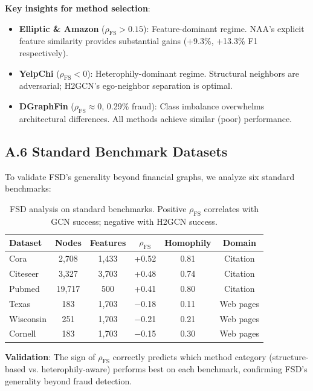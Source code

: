 \textbf{Key insights for method selection}:
\begin{itemize}
\item \textbf{Elliptic \& Amazon} ($\rho_{\text{FS}} > 0.15$): Feature-dominant regime. NAA's explicit feature similarity provides substantial gains (+9.3\%, +13.3\% F1 respectively).
\item \textbf{YelpChi} ($\rho_{\text{FS}} < 0$): Heterophily-dominant regime. Structural neighbors are adversarial; H2GCN's ego-neighbor separation is optimal.
\item \textbf{DGraphFin} ($\rho_{\text{FS}} \approx 0$, 0.29\% fraud): Class imbalance overwhelms architectural differences. All methods achieve similar (poor) performance.
\end{itemize}

\subsection*{A.6 Standard Benchmark Datasets}

To validate FSD's generality beyond financial graphs, we analyze six standard benchmarks:

\begin{table}[h]
\centering
\small
\begin{tabular}{lccccc}
\toprule
\textbf{Dataset} & \textbf{Nodes} & \textbf{Features} & $\rho_{\text{FS}}$ & \textbf{Homophily} & \textbf{Domain} \\
\midrule
Cora & 2,708 & 1,433 & +0.52 & 0.81 & Citation \\
Citeseer & 3,327 & 3,703 & +0.48 & 0.74 & Citation \\
Pubmed & 19,717 & 500 & +0.41 & 0.80 & Citation \\
\midrule
Texas & 183 & 1,703 & $-$0.18 & 0.11 & Web pages \\
Wisconsin & 251 & 1,703 & $-$0.21 & 0.21 & Web pages \\
Cornell & 183 & 1,703 & $-$0.15 & 0.30 & Web pages \\
\bottomrule
\end{tabular}
\caption{FSD analysis on standard benchmarks. Positive $\rho_{\text{FS}}$ correlates with GCN success; negative with H2GCN success.}
\end{table}

\textbf{Validation}: The sign of $\rho_{\text{FS}}$ correctly predicts which method category (structure-based vs. heterophily-aware) performs best on each benchmark, confirming FSD's generality beyond fraud detection.

